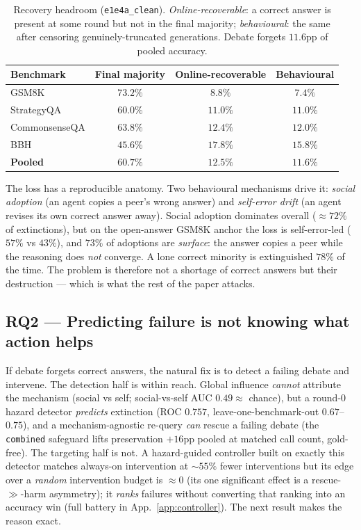 \begin{table}[t]
\centering\small
\caption{Recovery headroom (\texttt{e1e4a\_clean}). \emph{Online-recoverable}: a correct answer is
present at some round but not in the final majority; \emph{behavioural}: the same after censoring
genuinely-truncated generations. Debate forgets $11.6$pp of pooled accuracy.}
\label{tab:headroom}
\begin{tabular}{lccc}
\toprule
Benchmark & Final majority & Online-recoverable & Behavioural \\
\midrule
GSM8K         & $73.2\%$ & $8.8\%$  & $7.4\%$  \\
StrategyQA    & $60.0\%$ & $11.0\%$ & $11.0\%$ \\
CommonsenseQA & $63.8\%$ & $12.4\%$ & $12.0\%$ \\
BBH           & $45.6\%$ & $17.8\%$ & $15.8\%$ \\
\midrule
\textbf{Pooled} & $\mathbf{60.7\%}$ & $\mathbf{12.5\%}$ & $\mathbf{11.6\%}$ \\
\bottomrule
\end{tabular}
\end{table}

The loss has a reproducible anatomy. Two behavioural mechanisms drive it: \emph{social adoption} (an
agent copies a peer's wrong answer) and \emph{self-error drift} (an agent revises its own correct
answer away). Social adoption dominates overall ($\approx\!72\%$ of extinctions), but on the
open-answer GSM8K anchor the loss is self-error-led ($57\%$ vs $43\%$), and $73\%$ of adoptions are
\emph{surface}: the answer copies a peer while the reasoning does \emph{not} converge. A lone correct
minority is extinguished $78\%$ of the time. The problem is therefore not a shortage of correct
answers but their destruction --- which is what the rest of the paper attacks.

\subsection{RQ2 --- Predicting failure is not knowing what action helps}
\label{sec:rq2main}

If debate forgets correct answers, the natural fix is to detect a failing debate and intervene. The
detection half is within reach. Global influence \emph{cannot} attribute the mechanism (social vs
self; social-vs-self AUC $0.49\approx$ chance), but a round-0 hazard
detector \emph{predicts} extinction (ROC $0.757$, leave-one-benchmark-out $0.67$--$0.75$), and a
mechanism-agnostic re-query \emph{can} rescue a failing debate (the \texttt{combined} safeguard lifts
preservation $+16$pp pooled at matched call count, gold-free). The targeting half is not. A
hazard-guided controller built on exactly this detector matches always-on intervention at
$\sim\!55\%$ fewer interventions but its edge over a \emph{random} intervention budget is
$\approx\!0$ (its one significant effect is a rescue-$\gg$-harm asymmetry); it \emph{ranks} failures
without converting that ranking into an accuracy win (full battery in App.~\ref{app:controller}). The
next result makes the reason exact.

